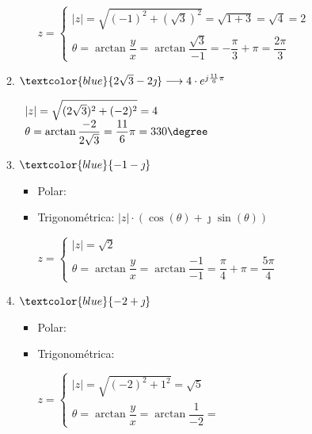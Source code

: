 \begin{enumerate}[label=\color{red}\textbf{\arabic*)}, leftmargin=*]
\begin{enumerate}[label=\color{red}\alph*)]
\begin{itemize}[label*=$-$]
		$z=\begin{cases}
			|z|=\sqrt{(-1)^2+(\sqrt{3})^2}=\sqrt{1+3}=\sqrt{4}=2\\
			\theta=\arctan\dfrac{y}{x}=\arctan\dfrac{\sqrt{3}}{-1}=-\dfrac{\pi}{3}+\pi=\dfrac{2\pi}{3}
		\end{cases}$
	\end{itemize}
	
	\item $\textcolor{blue}{2\sqrt{3}-2\jmath}\longrightarrow 4\cdot e^{j\frac{11}{6}\pi}$
	
	$\begin{array}{l}
		|z|=\sqrt{(2\sqrt{3})^2+(-2)^2}=4\\
		\theta=\arctan\dfrac{-2}{2\sqrt{3}}=\dfrac{11}{6}\pi=330\degree
	\end{array}$
	\item $\textcolor{blue}{-1-\jmath }$
	\begin{itemize}[label=$-$]
		\item Polar:
		\item Trigonométrica: $|z|\cdot(\cos(\theta)+\jmath\sin(\theta))$
		
		$z=\begin{cases}
			|z|=\sqrt{2}\\
			\theta=\arctan\dfrac{y}{x}=\arctan\dfrac{-1}{-1}=\dfrac{\pi}{4}+\pi=\dfrac{5\pi}{4}
		\end{cases}$
	\end{itemize}
	\item $\textcolor{blue}{-2+\jmath }$
	\begin{itemize}[label=$-$]
		\item Polar:
		\item Trigonométrica:
		
		$z=\begin{cases}
			|z|=\sqrt{(-2)^2+1^2}=\sqrt{5}\\
			\theta=\arctan\dfrac{y}{x}=\arctan\dfrac{1}{-2}=
		\end{cases}$
	\end{itemize}
	

\end{enumerate}
\end{enumerate}
